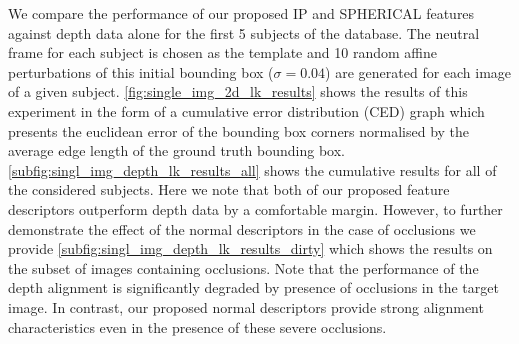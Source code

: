 We compare the performance of our proposed IP and SPHERICAL features against
depth data alone for the first 5 subjects of the database. The neutral frame
for each subject is chosen as the template and 10 random affine perturbations
of this initial bounding box ($\sigma = 0.04$) are generated for each image 
of a given subject.
\cref{fig:single_img_2d_lk_results} shows the results of this experiment in
the form of a cumulative error distribution (CED) graph which presents
the euclidean error of the bounding box corners normalised by the
average edge length of the ground truth bounding box.
\cref{subfig:singl_img_depth_lk_results_all} shows the cumulative results for
all of the considered subjects. Here we note that both of our proposed
feature descriptors outperform depth data by a comfortable margin. However,
to further demonstrate the effect of the normal descriptors in the case of
occlusions we provide \cref{subfig:singl_img_depth_lk_results_dirty} which
shows the results on the subset of images containing occlusions. Note that
the performance of the depth alignment is significantly degraded by presence
of occlusions in the target image. In contrast, our proposed normal descriptors
provide strong alignment characteristics even in the presence of these
severe occlusions.
